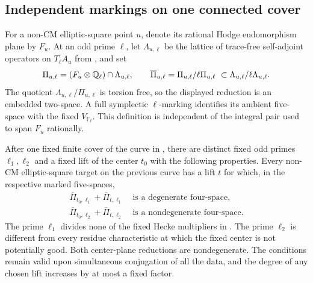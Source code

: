 \subsection{Independent markings on one connected cover}

For a non-CM elliptic-square point $u$, denote its rational Hodge
endomorphism plane by $F_u$.  At an odd prime $\ell$, let
$\Lambda_{u,\ell}$ be the lattice of trace-free self-adjoint operators
on $T_\ell A_u$ from , and set
\begin{equation}\label{inc:saturation}
 \Pi_{u,\ell}=(F_u\otimes\mathbb Q_\ell)\cap\Lambda_{u,\ell},
 \qquad
 \overline\Pi_{u,\ell}=\Pi_{u,\ell}/\ell\Pi_{u,\ell}
       \ \subset\Lambda_{u,\ell}/\ell\Lambda_{u,\ell}.
\end{equation}
The quotient $\Lambda_{u,\ell}/\Pi_{u,\ell}$ is torsion free,
so the displayed reduction is an embedded two-space.  A full
symplectic $\ell$-marking identifies its ambient five-space with the
fixed $V_{\mathbb F_\ell}$.  This definition is independent of the
integral pair used to span $F_u$ rationally.

\begin{proposition}\label{inc:markings}
After one fixed finite cover of the curve in , there
are distinct fixed odd primes $\ell_1,\ell_2$ and a fixed lift of the
center $t_0$ with the following properties.  Every non-CM elliptic-square
target on the previous curve has a lift $t$ for which, in the respective marked
five-spaces,
\begin{align}
 \overline\Pi_{t_0,\ell_1}+\overline\Pi_{t,\ell_1}
   &\text{ is a degenerate four-space},\label{inc:first}\\
 \overline\Pi_{t_0,\ell_2}+\overline\Pi_{t,\ell_2}
   &\text{ is a nondegenerate four-space}.\label{inc:second}
\end{align}
The prime $\ell_1$ divides none of the fixed Hecke multipliers in
.  The prime $\ell_2$ is different from every
residue characteristic at which the fixed center is not potentially
good.  Both center-plane reductions are nondegenerate.  The conditions
remain valid upon simultaneous conjugation of all the data, and the
degree of any chosen lift increases by at most a fixed factor.
\end{proposition}

